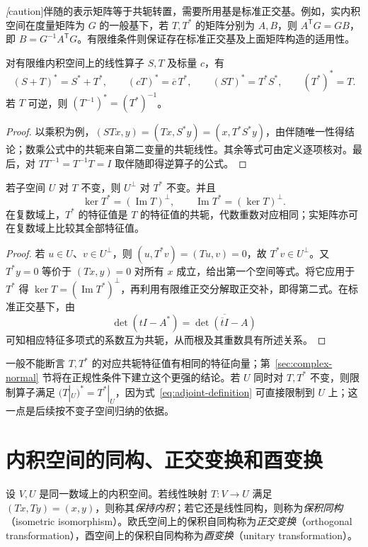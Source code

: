 \emph[caution]{伴随的表示矩阵等于共轭转置，需要所用基是标准正交基}。例如，实内积空间在度量矩阵为 $G$ 的一般基下，若 $T,T^*$ 的矩阵分别为 $A,B$，则 $A^{\mathsf T}G=GB$，即 $B=G^{-1}A^{\mathsf T}G$。有限维条件则保证存在标准正交基及上面矩阵构造的适用性。

\begin{proposition}
\label{prop:adjoint-properties}
对有限维内积空间上的线性算子 $S,T$ 及标量 $c$，有
\[
    (S+T)^*=S^*+T^*,\qquad (cT)^*=\overline c\,T^*,\qquad
    (ST)^*=T^*S^*,\qquad (T^*)^*=T.
\]
若 $T$ 可逆，则 $(T^{-1})^*=(T^*)^{-1}$。
\end{proposition}
\begin{proof}
以乘积为例，$(STx,y)=(Tx,S^*y)=(x,T^*S^*y)$，由伴随唯一性得结论；数乘公式中的共轭来自第二变量的共轭线性。其余等式可由定义逐项核对。最后，对 $TT^{-1}=T^{-1}T=I$ 取伴随即得逆算子的公式。
\end{proof}

\begin{proposition}
\label{prop:adjoint-invariant-kernel}
若子空间 $U$ 对 $T$ 不变，则 $U^\perp$ 对 $T^*$ 不变。并且
\[
    \ker T^*=(\operatorname{Im}T)^\perp,\qquad
    \operatorname{Im}T^*=(\ker T)^\perp.
\]
在复数域上，$T^*$ 的特征值是 $T$ 的特征值的共轭，代数重数对应相同；实矩阵亦可在复数域上比较其全部特征值。
\end{proposition}
\begin{proof}
若 $u\in U$、$v\in U^\perp$，则 $(u,T^*v)=(Tu,v)=0$，故 $T^*v\in U^\perp$。又 $T^*y=0$ 等价于 $(Tx,y)=0$ 对所有 $x$ 成立，给出第一个空间等式。将它应用于 $T^*$ 得 $\ker T=(\operatorname{Im}T^*)^\perp$，再利用有限维正交分解取正交补，即得第二式。在标准正交基下，由
\[
    \det(tI-A^*)=\overline{\det(\overline t I-A)}
\]
可知相应特征多项式的系数互为共轭，从而根及其重数具有所述关系。
\end{proof}

一般不能断言 $T,T^*$ 的对应共轭特征值有相同的特征向量；第~\ref{sec:complex-normal} 节将在正规性条件下建立这个更强的结论。若 $U$ 同时对 $T,T^*$ 不变，则限制算子满足 $(T|_U)^*=T^*|_U$，因为式~\eqref{eq:adjoint-definition} 可直接限制到 $U$ 上；这一点是后续按不变子空间归纳的依据。

\section{内积空间的同构、正交变换和酉变换}
\label{sec:isometry-unitary-qr}

\begin{definition}
设 $V,U$ 是同一数域上的内积空间。若线性映射 $T:V\to U$ 满足 $(Tx,Ty)=(x,y)$，则称其\emph{保持内积}；若它还是线性同构，则称为\emph{保积同构}（isometric isomorphism）。欧氏空间上的保积自同构称为\emph{正交变换}（orthogonal transformation），酉空间上的保积自同构称为\emph{酉变换}（unitary transformation）。
\end{definition}

